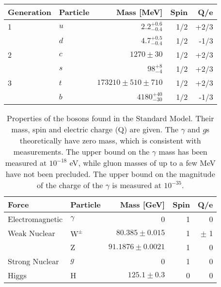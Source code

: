 \begin{table}[h!]
\centering
\begin{tabular}{l l r r r}
\hline
Generation & Particle & Mass [MeV] & Spin & Q/e \\
\hline
1 & $u$ & $2.2^{+0.6}_{-0.4}$ & 1/2 & +2/3 \\
 & $d$ & $4.7^{+0.5}_{-0.4}$ & 1/2 & -1/3 \\
\hline
2 & $c$ & $1270\pm30$ & 1/2 & +2/3 \\
 & $s$ & $98^{+8}_{-4}$ & 1/2 & +2/3 \\
\hline
3 & $t$ & $173210 \pm 510 \pm 710$ & 1/2 & +2/3 \\
 & $b$ & $4180^{+40}_{-30}$ & 1/2 & -1/3 \\
\end{tabular}
\caption[]{}
\label{table:smquarks}
\end{table}

\begin{table}[h!]
\centering
\begin{tabular}{l l r r r}
\hline
Force & Particle & Mass [GeV] & Spin & Q/e \\
\hline
Electromagnetic & $\gamma$ & 0 & 1 & 0 \\
\hline
Weak Nuclear & $\text{W}^{\pm}$ & $80.385 \pm 0.015$ & 1 & $\pm$ 1 \\
& Z & $91.1876 \pm 0.0021$ & 1 & 0 \\
\hline
Strong Nuclear & $g$ & 0 & 1 & 0 \\
\hline
Higgs & H & $125.1 \pm 0.3$ & 0 & 0 \\
\end{tabular}
\caption[Properties of the bosons found in the Standard Model.  Their mass, spin and electric charge (Q) are given.  The $\gamma$ and $g$s theoretically have zero mass, which is consistent with measurements.  The upper bound on the $\gamma$ mass has been measured at $10^{-18}$ eV, while gluon masses of up to a few MeV have not been precluded.  The upper bound on the magnitude of the charge of the $\gamma$ is measured at $10^{-35}$.]{Properties of the bosons found in the Standard Model.  Their mass, spin and electric charge (Q) are given.  The $\gamma$ and $g$s theoretically have zero mass, which is consistent with measurements.  The upper bound on the $\gamma$ mass has been measured at $10^{-18}$ eV, while gluon masses of up to a few MeV have not been precluded.  The upper bound on the magnitude of the charge of the $\gamma$ is measured at $10^{-35}$.}
\label{table:smbosons}
\end{table}

